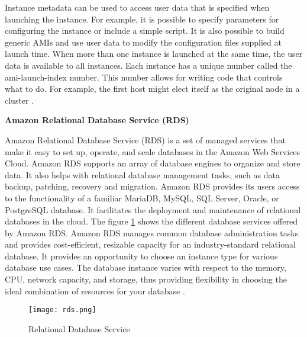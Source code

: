 \par Instance metadata can be used to access user data that is specified when launching the instance. For example, it
is possible to specify parameters for configuring the instance or include a simple script. It is also possible to
build generic AMIs and use user data to modify the configuration files supplied at launch time. When more than one instance is launched at the same time, the user data is available to all instances. Each instance has a unique number called the ami-launch-index number. This number allows for writing code that controls what to do. For example, the first host might elect itself as the original node in a cluster \cite{33}.

\textbf{Amazon Relational Database Service (RDS)}

\par Amazon Relational Database Service (RDS) is a set of managed services that make it easy to set up, operate, and scale databases in the Amazon Web Services Cloud. Amazon RDS supports an array of database engines to organize and store data. It also helps with relational database management tasks, such as data backup, patching, recovery and migration. Amazon RDS provides its users access to the functionality of a familiar MariaDB, MySQL, SQL Server, Oracle, or PostgreSQL database. It facilitates the deployment and maintenance of relational databases in the cloud. The figure \ref{fig:rds} shows the different database services offered by Amazon RDS. Amazon RDS manages common database administration tasks and provides cost-efficient, resizable capacity for an industry-standard relational database. It provides an opportunity to choose an instance type for various database use cases. The database instance varies with respect to the memory, CPU, network capacity, and storage, thus providing flexibility in choosing the ideal combination of resources for your database \cite{34}.
\begin{figure}
    \centering
    \texttt{[image: rds.png]}
    \caption{Relational Database Service}
    \label{fig:rds}
\end{figure}

